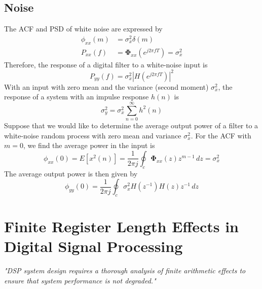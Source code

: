 \documentclass[11pt]{book}
\theoremstyle{example}
\begin{document}
\section{Noise}

The ACF and PSD of white noise are expressed by
\begin{align}
	\phi_{xx}(m)&=\sigma_x^2\delta(m)\\
	P_{xx}(f)&=\mathbf{\Phi}_{xx}(e^{j2{\pi}fT})=\sigma_x^2
\end{align}
Therefore, the response of a digital filter to a white-noise input is
\begin{equation}
	P_{yy}(f)=\sigma_x^2|H(e^{j2{\pi}fT})|^2
\end{equation}
With an input with zero mean and the variance (second moment) $\sigma_x^2$, the response of a system with an impulse response $h(n)$ is
\begin{equation}
	\sigma_y^2=\sigma_x^2\sum_{n=0}^{\infty}{h^2(n)}
\end{equation}
Suppose that we would like to determine the average output power of a filter to a white-noise random process with zero mean and variance $\sigma_x^2$. For the ACF with $m=0$, we find the average power in the input is
\begin{equation}
	\phi_{xx}(0)=E[x^2(n)]=\frac{1}{2{\pi}j}\oint_c{\mathbf{\Phi}_{xx}(z)z^{m-1}\,dz}=\sigma_x^2
\end{equation}
The average output power is then given by
\begin{equation}
	\phi_{yy}(0)=\frac{1}{2{\pi}j}\oint_c{\sigma_x^2H(z^{-1})H(z)z^{-1}\,dz}
\end{equation}

\chapter[Finite Register Effects in DSP]{Finite Register Length Effects in Digital Signal Processing}

\begin{center}
\textit{"DSP system design requires a thorough analysis of finite arithmetic effects to ensure that system performance is not degraded."}
\end{center}
\vspace{1em}
\setcounter{section}{-1}
\end{document}
